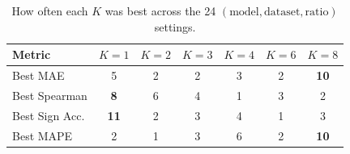 \begin{table}[t]
\centering
\setlength{\tabcolsep}{5pt}
\renewcommand{\arraystretch}{1.12}
\begin{tabular}{l|cccccc}
\toprule
Metric & $K=1$ & $K=2$ & $K=3$ & $K=4$ & $K=6$ & $K=8$ \\
\midrule
Best MAE & 5 & 2 & 2 & 3 & 2 & \textbf{10} \\
Best Spearman & \textbf{8} & 6 & 4 & 1 & 3 & 2 \\
Best Sign Acc. & \textbf{11} & 2 & 3 & 4 & 1 & 3 \\
Best MAPE & 2 & 1 & 3 & 6 & 2 & \textbf{10} \\
\bottomrule
\end{tabular}
\caption{How often each $K$ was best across the 24 $(\text{model}, \text{dataset}, \text{ratio})$ settings.}
\label{tab:metis_k_sweep_bestk_counts}
\end{table}
